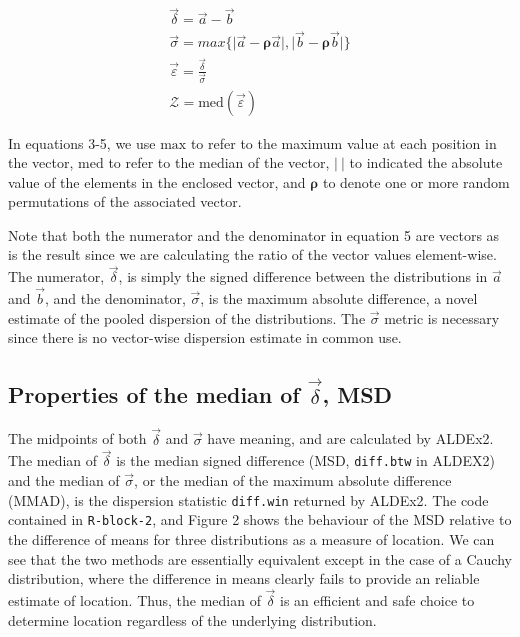 \documentclass[onecolumn]{article}
\begin{document}
\begin{align}
    \vec{\delta} = \vec{a} - \vec{b}\\
    \vec{\sigma} =  max \{ \lvert \vec{a} - \boldsymbol{\rho} \vec{a}  \rvert ,\lvert \vec{b} -\boldsymbol{\rho} \vec{b} \rvert \}\\
  \vec{\varepsilon} =  \frac{ \vec{\delta} }{ \vec{\sigma} }\\
  \mathcal{Z} = \mathrm{med} (\vec{\varepsilon})
  \label{Fe}
\end{align}

In equations 3-5, we use \(\mathrm{max}\) to refer to the maximum value
at each position in the vector, \(\mathrm{med}\) to refer to the median
of the vector, \(\lvert~\rvert\) to indicated the absolute value of the
elements in the enclosed vector, and \(\boldsymbol{\rho}\) to denote one
or more random permutations of the associated vector.

Note that both the numerator and the denominator in equation 5 are
vectors as is the result since we are calculating the ratio of the
vector values element-wise. The numerator, \(\vec{\delta}\), is simply
the signed difference between the distributions in \(\vec{a}\) and
\(\vec{b}\), and the denominator, \(\vec{\sigma}\), is the maximum
absolute difference, a novel estimate of the pooled dispersion of the
distributions. The \(\vec{\sigma}\) metric is necessary since there is
no vector-wise dispersion estimate in common use.

\hypertarget{properties-of-the-median-of-vecdelta-msd}{%
\subsection{\texorpdfstring{Properties of the median of
\(\vec{\delta}\),
MSD}{Properties of the median of \textbackslash{}vec\{\textbackslash{}delta\}, MSD}}\label{properties-of-the-median-of-vecdelta-msd}}

The midpoints of both \(\vec{\delta}\) and \(\vec{\sigma}\) have
meaning, and are calculated by ALDEx2. The median of \(\vec{\delta}\) is
the median signed difference (MSD, \texttt{diff.btw} in ALDEX2) and the
median of \(\vec{\sigma}\), or the median of the maximum absolute
difference (MMAD), is the dispersion statistic \texttt{diff.win}
returned by ALDEx2. The code contained in \texttt{R-block-2}, and Figure
2 shows the behaviour of the MSD relative to the difference of means for
three distributions as a measure of location. We can see that the two
methods are essentially equivalent except in the case of a Cauchy
distribution, where the difference in means clearly fails to provide an
reliable estimate of location. Thus, the median of \(\vec{\delta}\) is
an efficient and safe choice to determine location regardless of the
underlying distribution.
\end{document}
